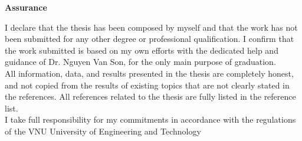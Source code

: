 \setcounter{page}{1}
\begin{center}
\textbf{\large{Assurance}	}
\end{center}
I declare that the thesis has been composed by myself and that the work has not been submitted for any other degree or professional qualification. I confirm that the work submitted is based on my own efforts with the dedicated help and guidance of Dr. Nguyen Van Son, for the only main purpose of graduation.\\
All information, data, and results presented in the thesis are completely honest, and not copied from the results of existing topics that are not clearly stated in the references. All references related to the thesis are fully listed in the reference list.\\
I take full responsibility for my commitments in accordance with the regulations of the VNU University of Engineering and Technology

\begin{flushright}
\\[0.5cm]
\\[2cm]
\end{flushright}
